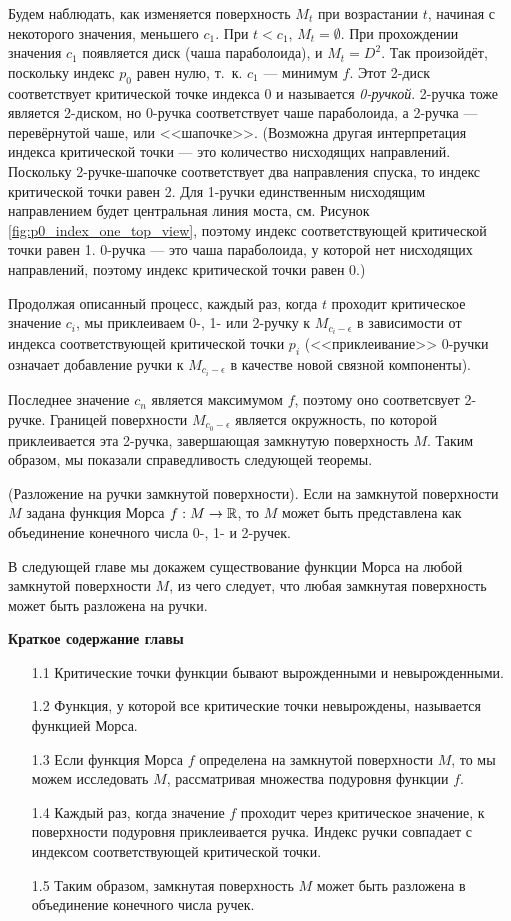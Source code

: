 \documentclass[a4paper,12pt,openany,leqno]{extbook}
\begin{document}
Будем наблюдать, как изменяется поверхность $M_t$ при возрастании $t$, начиная с некоторого значения, меньшего $c_1$. При $t < c_1$, $M_t = \emptyset$. При прохождении значения $c_1$ появляется диск (чаша параболоида), и $M_t = D^2$. Так произойдёт, поскольку индекс $p_0$ равен нулю, т.~к. $c_1$ --- минимум $f$. Этот 2-диск соответствует критической точке индекса 0 и называется \emph{0-ручкой}. 2-ручка тоже является 2-диском, но 0-ручка соответствует чаше параболоида, а 2-ручка --- перевёрнутой чаше, или <<шапочке>>. (Возможна другая интерпретация индекса критической точки --- это количество нисходящих направлений. Поскольку 2-ручке-шапочке соответствует два направления спуска, то индекс критической точки равен 2. Для 1-ручки единственным нисходящим направлением будет центральная линия моста, см. Рисунок \ref{fig:p0_index_one_top_view}, поэтому индекс соответствующей критической точки равен 1. 0-ручка --- это чаша параболоида, у которой нет нисходящих направлений, поэтому индекс критической точки равен 0.)

Продолжая описанный процесс, каждый раз, когда $t$ проходит критическое значение $c_i$, мы приклеиваем 0-, 1- или 2-ручку к $M_{c_i - \epsilon}$ в зависимости от индекса соответствующей критической точки $p_i$ (<<приклеивание>> 0-ручки означает добавление ручки к $M_{c_i - \epsilon}$ в качестве новой связной компоненты).

Последнее значение $c_n$ является максимумом $f$, поэтому оно соответсвует 2-ручке. Границей поверхности $M_{c_0 - \epsilon}$ является окружность, по которой приклеивается эта 2-ручка, завершающая замкнутую поверхность $M$. Таким образом, мы показали справедливость следующей теоремы.

\begin{theorem} (Разложение на ручки замкнутой поверхности). Если на замкнутой поверхности $M$ задана функция Морса $f : M \to \mathbb{R}$, то $M$ может быть представлена как объединение конечного числа 0-, 1- и 2-ручек.
\end{theorem}

В следующей главе мы докажем существование функции Морса на любой замкнутой поверхности $M$, из чего следует, что любая замкнутая поверхность может быть разложена на ручки.

\textbf{Краткое содержание главы}
\begin{itemize}
\item[1.1] Критические точки функции бывают вырожденными и невырожденными.
\item[1.2] Функция, у которой все критические точки невырождены, называется функцией Морса.
\item[1.3] Если функция Морса $f$ определена на замкнутой поверхности $M$, то мы можем исследовать $M$, рассматривая множества подуровня функции $f$.
\item[1.4] Каждый раз, когда значение $f$ проходит через критическое значение, к поверхности подуровня приклеивается ручка. Индекс ручки совпадает с индексом соответствующей критической точки.
\item[1.5] Таким образом, замкнутая поверхность $M$ может быть разложена в объединение конечного числа ручек.
\end{itemize}
\end{document}
